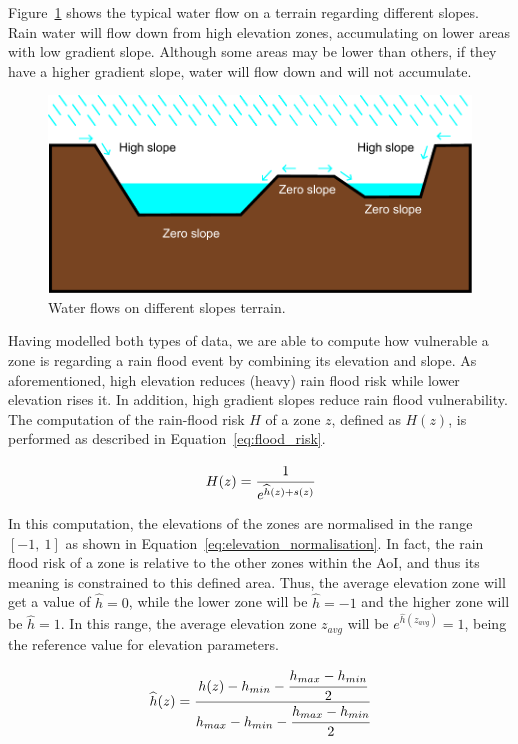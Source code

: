 \begin{refsection}
Figure~\ref{fig:water_flow} shows the typical water flow on a terrain regarding different slopes. Rain water will flow down from high elevation zones, accumulating on lower areas with low gradient slope. Although some areas may be lower than others, if they have a higher gradient slope, water will flow down and will not accumulate.

\begin{figure}[h]
    \centering
    \includegraphics[width=0.85\linewidth]{Chapters/6-Flood/figs/chuva.pdf}
    \caption{Water flows on different slopes terrain.}
    \label{fig:water_flow}
\end{figure}

Having modelled both types of data, we are able to compute how vulnerable a zone is regarding a rain flood event by combining its elevation and slope. As aforementioned, high elevation reduces (heavy) rain flood risk while lower elevation rises it. In addition, high gradient slopes reduce rain flood vulnerability. The computation of the rain-flood risk $H$ of a zone $z$, defined as $H(z)$, is performed as described in Equation~\ref{eq:flood_risk}.

\begin{equation}
    \label{eq:flood_risk}
    H(z) = \cfrac{1}{e^{\widehat{h}(z) + s(z)}} 
\end{equation}

In this computation, the elevations of the zones are normalised in the range $[-1,~1]$ as shown in Equation~\ref{eq:elevation_normalisation}. In fact, the rain flood risk of a zone is relative to the other zones within the AoI, and thus its meaning is constrained to this defined area. Thus, the average elevation zone will get a value of $\widehat{h} = 0$, while the lower zone will be $\widehat{h} = -1$ and the higher zone will be $\widehat{h} = 1$. In this range, the average elevation zone $z_{avg}$ will be $e^{\widehat{h}(z_{avg})} = 1$, being the reference value for elevation parameters.

\begin{equation}
    \label{eq:elevation_normalisation}
    \widehat{h}(z) = \cfrac{h(z) - h_{min} - \cfrac{h_{max} - h_{min}}{2}}{h_{max} - h_{min} - \cfrac{h_{max} - h_{min}}{2}}
\end{equation}


\end{refsection}
